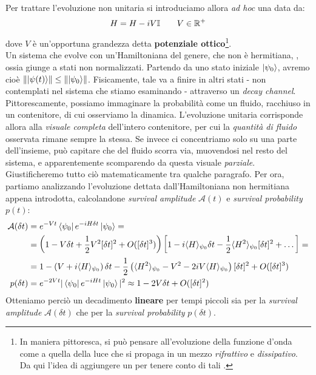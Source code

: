 \documentclass[../../InformazioneQuantistica.tex]{subfiles}
\begin{document}
Per trattare l'evoluzione non unitaria si introduciamo allora \textit{ad hoc} una  data da:
\begin{align}
H = H -i V\mathbb{I} \qquad V\in \mathbb{R}^+
\label{eqn:non-hermitian-Hamiltonian}
\end{align} 
dove $V$ è un'opportuna grandezza detta \textbf{potenziale ottico}\footnote{In maniera pittoresca, si può pensare all'evoluzione della funzione d'onda come a quella della luce che si propaga in un mezzo \textit{rifrattivo} e \textit{dissipativo}. Da qui l'idea di aggiungere un  per tenere conto di tali .}.\\
Un sistema che evolve con un'Hamiltoniana del genere, che non è hermitiana, , ossia giunge a stati non normalizzati. Partendo da uno stato iniziale $\Ket{\psi_0}$, avremo cioè $\left\lVert\Ket{\psi(t)}\right\rVert \leq \left\lVert\Ket{\psi_0}\right\rVert$. Fisicamente, tale  va a finire in altri stati - non contemplati nel sistema che stiamo esaminando - attraverso un \textit{decay channel}. Pittorescamente, possiamo immaginare la probabilità come un fluido, racchiuso in un contenitore, di cui osserviamo la dinamica. L'evoluzione unitaria corrisponde allora alla \textit{visuale completa} dell'intero contenitore, per cui la \textit{quantità di fluido} osservata rimane sempre la stessa. Se invece ci concentriamo solo su una parte dell'insieme, può capitare che del fluido scorra via, muovendosi nel resto del sistema, e apparentemente scomparendo da questa visuale \textit{parziale}.\\
Giustificheremo tutto ciò matematicamente tra qualche paragrafo. Per ora, partiamo analizzando l'evoluzione dettata dall'Hamiltoniana non hermitiana appena introdotta, calcolandone \textit{survival amplitude} $\mathcal{A}(t)$ e \textit{survival probability} $p(t)$:
\begin{align*}
\mathcal{A}(\delta t) &= e^{-Vt} \Bra{\psi_0} e^{-iH\delta t}\Ket{\psi_0}=\\
&=\left(1-V\delta t + \frac{1}{2}V^2 [\delta t]^2 + O([\delta t]^3)\right)\left[1 - i\langle H \rangle_{\psi_0}\delta t-\frac{1}{2}\langle H^2 \rangle_{\psi_0}[\delta t]^2 + \dots \right]=\\
&= 1-\left(V+i\langle H \rangle_{\psi_0}\right)\delta t -\frac{1}{2}\left(\langle H^2\rangle_{\psi_0} - V^2 - 2iV\langle H \rangle_{\psi_0} \right) [\delta t]^2 + O([\delta t]^3)\\
p(\delta t) &= e^{-2Vt} |\Bra{\psi_0} e^{-iHt}\Ket{\psi_0}|^2 \approx 1-2V \delta t + O([\delta t]^2)
\end{align*}
Otteniamo perciò un decadimento \textbf{lineare} per tempi piccoli sia per la \textit{survival amplitude} $\mathcal{A}(\delta t)$ che per la \textit{survival probability} $p(\delta t)$.
\end{document}

